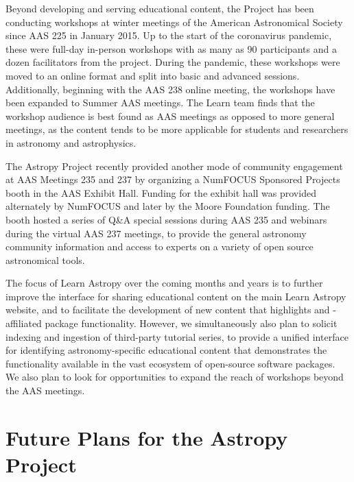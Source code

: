 \documentclass[modern]{aastex631}
\begin{document}
Beyond developing and serving educational content, the \astropy Project has been
conducting workshops at winter meetings of the American Astronomical Society
since AAS 225 in January 2015.
Up to the start of the coronavirus pandemic, these were full-day in-person
workshops with as many as 90 participants and a dozen facilitators from the
project.
During the pandemic, these workshops were moved to an online format and split
into basic and advanced sessions.
Additionally, beginning with the AAS 238 online meeting, the workshops have been
expanded to Summer AAS meetings.
The Learn team finds that the workshop audience is best found as AAS meetings as
opposed to more general \python meetings, as the content tends to be more
applicable for students and researchers in astronomy and astrophysics.

The Astropy Project recently provided another mode of community engagement at
AAS Meetings 235 and 237 by organizing a NumFOCUS Sponsored Projects booth in
the AAS Exhibit Hall.
Funding for the exhibit hall was provided alternately by NumFOCUS and later by
the Moore Foundation funding.
The booth hosted a series of Q\&A special sessions during AAS 235 and webinars
during the virtual AAS 237 meetings, to provide the general astronomy community
information and access to experts on a variety of open source astronomical
tools.


The focus of Learn Astropy over the coming months and years is to further
improve the interface for sharing educational content on the main Learn Astropy
website, and to facilitate the development of new content that highlights
\astropy and \astropy-affiliated package functionality.
However, we simultaneously also plan to solicit indexing and ingestion of
third-party tutorial series, to provide a unified interface for identifying
astronomy-specific educational content that demonstrates the functionality
available in the vast ecosystem of open-source software packages.
We also plan to look for opportunities to expand the reach of \astropy workshops
beyond the AAS meetings.


\section{Future Plans for the Astropy Project} \label{sec:future}
\end{document}
